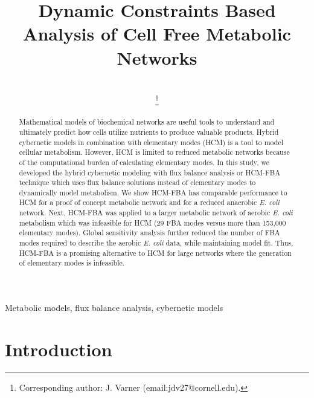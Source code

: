 \documentclass[10pt,twocolumn,twoside,final]{IEEEtran}
\begin{document}
\title{Dynamic Constraints Based Analysis of Cell Free Metabolic Networks}


\author{\\
\thanks{Corresponding author: J. Varner (email:jdv27@cornell.edu).}}

\maketitle

\begin{abstract}
Mathematical models of biochemical networks are useful tools to understand and ultimately predict how cells utilize nutrients to produce valuable products.
Hybrid cybernetic models in combination with elementary modes (HCM) is a tool to model cellular metabolism.
However, HCM is limited to reduced metabolic networks because of the computational burden of calculating elementary modes.
In this study, we developed the hybrid cybernetic modeling with flux balance analysis or HCM-FBA technique which uses flux balance solutions instead of elementary modes
to dynamically model metabolism.
We show HCM-FBA has comparable performance to HCM for a proof of concept metabolic network and for a reduced anaerobic \textit{E. coli} network.
Next, HCM-FBA was applied to a larger metabolic network of aerobic \textit{E. coli} metabolism which was infeasible for HCM (29 FBA modes versus more than 153,000 elementary modes).
Global sensitivity analysis further reduced the number of FBA modes required to describe the aerobic \textit{E. coli} data, while maintaining model fit.
Thus, HCM-FBA is a promising alternative to HCM for large networks where the generation of elementary modes is infeasible.

\end{abstract}


\begin{IEEEkeywords}
Metabolic models, flux balance analysis, cybernetic models
\end{IEEEkeywords}

\section{Introduction}
\end{document}
